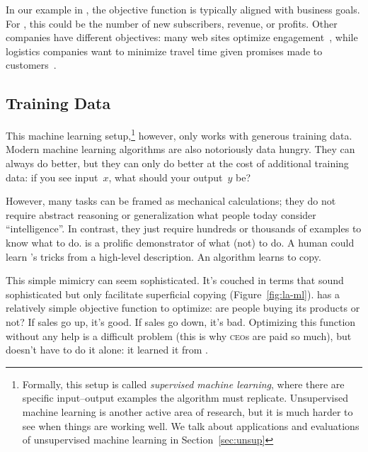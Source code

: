 In our example in \crunchyCity{}, the objective function is typically
aligned with business goals.
%
For \energyCompany{}, this could be the number of new subscribers,
revenue, or profits.
%
Other companies have different objectives: many web sites optimize
engagement~\citep{hoiles-17}, while logistics companies want to
minimize travel time given promises made to customers~\citep{fiat-16}.

\subsection{Training Data}

This machine learning setup,\footnote{Formally, this setup is called
  \emph{supervised machine learning}, where there are specific
  input--output examples the algorithm must replicate.  Unsupervised
  machine learning is another active area of research, but it is much
  harder to see when things are working well.  We talk about
  applications and evaluations of unsupervised machine learning in
  Section~\ref{sec:unsup}} however, only works with generous training
data.  Modern machine learning algorithms are also notoriously data
hungry.  They can always do better, but they can only do better at the
cost of additional training data: if you see input~$x$, what should
your output~$y$ be?

However, many tasks can be framed as mechanical calculations; they
do not require abstract reasoning or generalization what people today
consider ``intelligence''.  In contrast, they just require hundreds
or thousands of examples to know what to do.  \energyJerk{} is a
prolific demonstrator of what (not) to do.  A human could learn
\energyJerk{}'s tricks from a high-level description.  An algorithm
learns to copy. 

This simple mimicry can seem sophisticated.  It's couched in terms
that sound sophisticated but only facilitate superficial copying
(Figure~\ref{fig:la-ml}).  \energyCompany{} has a relatively simple
objective function to optimize: are people buying its
products or not?  If sales go up, it's good.  If sales go down, it's
bad.  Optimizing this function without any help is a difficult problem
(this is why \textsc{ceo}s are paid so much), but \energyCompany{}
doesn't have to do it alone: it learned it from \energyJerk{}.

